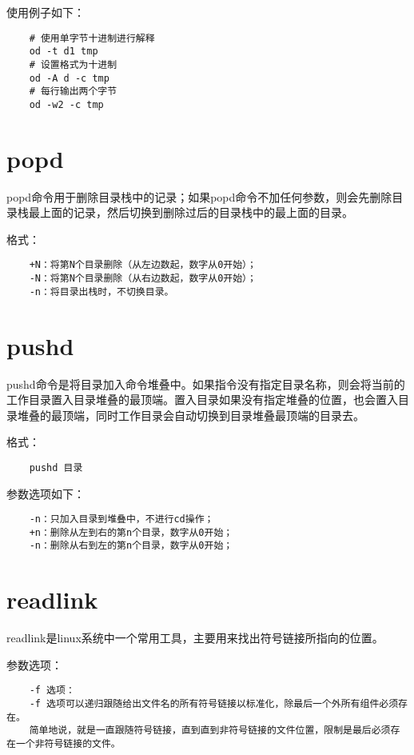 \documentclass[a4paper,left=2.5cm,right=2.5cm,11pt]{article}
\begin{document}
	使用例子如下：
	\begin{lstlisting}
	# 使用单字节十进制进行解释
	od -t d1 tmp
	# 设置格式为十进制
	od -A d -c tmp
	# 每行输出两个字节
	od -w2 -c tmp
	\end{lstlisting}

\section{popd}
	popd命令用于删除目录栈中的记录；如果popd命令不加任何参数，则会先删除目录栈最上面的记录，然后切换到删除过后的目录栈中的最上面的目录。\par

	格式：
	\begin{lstlisting}
	+N：将第N个目录删除（从左边数起，数字从0开始）； 
	-N：将第N个目录删除（从右边数起，数字从0开始）； 
	-n：将目录出栈时，不切换目录。
	\end{lstlisting}

\section{pushd}
	pushd命令是将目录加入命令堆叠中。如果指令没有指定目录名称，则会将当前的工作目录置入目录堆叠的最顶端。置入目录如果没有指定堆叠的位置，也会置入目录堆叠的最顶端，同时工作目录会自动切换到目录堆叠最顶端的目录去。\par

	格式：
	\begin{lstlisting}
	pushd 目录
	\end{lstlisting}

	参数选项如下：
	\begin{lstlisting}
	-n：只加入目录到堆叠中，不进行cd操作； 
	+n：删除从左到右的第n个目录，数字从0开始； 
	-n：删除从右到左的第n个目录，数字从0开始；
	\end{lstlisting}

\section{readlink}
	readlink是linux系统中一个常用工具，主要用来找出符号链接所指向的位置。\par

	参数选项：
	\begin{lstlisting}
	-f 选项：
	-f 选项可以递归跟随给出文件名的所有符号链接以标准化，除最后一个外所有组件必须存在。
	简单地说，就是一直跟随符号链接，直到直到非符号链接的文件位置，限制是最后必须存在一个非符号链接的文件。
	\end{lstlisting}
\end{document}
